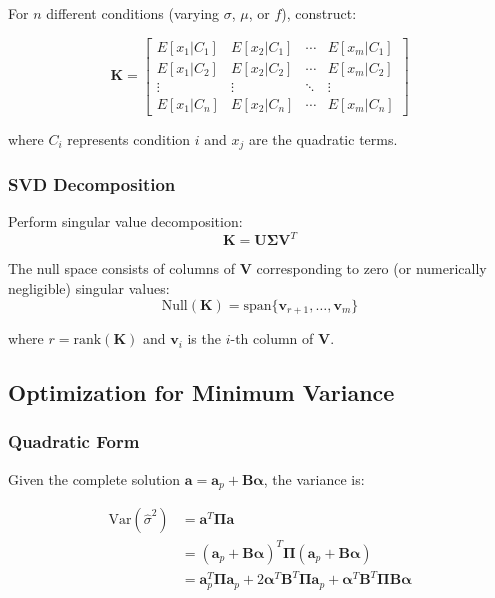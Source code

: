 For $n$ different conditions (varying $\sigma$, $\mu$, or $f$), construct:

\begin{equation}
\mathbf{K} = \begin{bmatrix}
E[x_1 | C_1] & E[x_2 | C_1] & \cdots & E[x_m | C_1] \\
E[x_1 | C_2] & E[x_2 | C_2] & \cdots & E[x_m | C_2] \\
\vdots & \vdots & \ddots & \vdots \\
E[x_1 | C_n] & E[x_2 | C_n] & \cdots & E[x_m | C_n]
\end{bmatrix}
\end{equation}

where $C_i$ represents condition $i$ and $x_j$ are the quadratic terms.

\subsubsection{ SVD Decomposition}

Perform singular value decomposition:
\begin{equation}
\mathbf{K} = \mathbf{U}\boldsymbol{\Sigma}\mathbf{V}^T
\end{equation}

The null space consists of columns of $\mathbf{V}$ corresponding to zero (or numerically negligible) singular values:
\begin{equation}
\text{Null}(\mathbf{K}) = \text{span}\{\mathbf{v}_{r+1}, \ldots, \mathbf{v}_m\}
\end{equation}

where $r = \text{rank}(\mathbf{K})$ and $\mathbf{v}_i$ is the $i$-th column of $\mathbf{V}$.

\subsection{Optimization for Minimum Variance}

\subsubsection{ Quadratic Form}

Given the complete solution $\mathbf{a} = \mathbf{a}_p + \mathbf{B}\boldsymbol{\alpha}$, the variance is:

\begin{align}
\text{Var}(\hat{\sigma}^2) &= \mathbf{a}^T\boldsymbol{\Pi}\mathbf{a} \\
&= (\mathbf{a}_p + \mathbf{B}\boldsymbol{\alpha})^T\boldsymbol{\Pi}(\mathbf{a}_p + \mathbf{B}\boldsymbol{\alpha}) \\
&= \mathbf{a}_p^T\boldsymbol{\Pi}\mathbf{a}_p + 2\boldsymbol{\alpha}^T\mathbf{B}^T\boldsymbol{\Pi}\mathbf{a}_p + \boldsymbol{\alpha}^T\mathbf{B}^T\boldsymbol{\Pi}\mathbf{B}\boldsymbol{\alpha}
\end{align}

